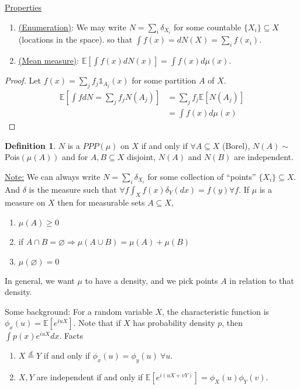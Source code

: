 \documentclass[12pt,letterpaper]{article}
\theoremstyle{definition}
\newtheorem{defn}[thm]{Definition}
\begin{document}
	\noindent\underline{Properties}
	\begin{enumerate}
		\item[]
		\underline{(Enumeration)}: We may write $N = \sum_{i} \delta_{X_i}$ for some countable $\{X_i\} \subseteq X$ (locations in the space). so that $\int f(x) = dN(X) = \sum_{i} f(x_i)$. 
		
		\item[]\underline{(Mean measure)}: $\mathbb{E}[\int f(x) dN(x)] = \int f(x) d\mu(x)$. 
	\end{enumerate}
	
	\begin{proof}
		Let $f(x) = \sum_j f_j \mathds{1}_{A_j}(x)$ for some partition $A$ of $X$. \begin{align*}
		\mathbb{E}\left[\int fdN = \sum_j f_j N(A_j)\right] &= \sum_j f_j \mathbb{E}[N(A_j)] \\
		&= \int f(x) d\mu(x)
		\end{align*}
	\end{proof}

	\begin{defn}
		$N$ is a $PPP(\mu)$ on $X$ if and only if $\forall A \subseteq X$ (Borel), $N(A) \sim$ Pois$(\mu(A))$ and for $A, B \subseteq X$ disjoint, $N(A)$ and $N(B)$ are independent. 
	\end{defn}

	\underline{Note:} We can always write $N = \sum_{i}\delta_{X_i}$ for some collection of ``points'' $\{X_i\} \subseteq X$. And $\delta$ is the measure such that $\forall f \int_X f(x) \delta_Y(dx) = f(y) \forall f$. If $\mu$ is a measure on $X$ then for measurable sets $A \subseteq X$, \begin{enumerate}
		\item $\mu(A) \geq 0$
		\item if $A \cap B = \varnothing \Rightarrow \mu(A \cup B) = \mu(A) + \mu(B)$
		\item $\mu(\varnothing) = 0$
	\end{enumerate}

	In general, we want $\mu$ to have a density, and we pick points $A$ in relation to that density. 
	
	Some background: For a random variable $X$, the characteristic function is $\phi_x(u) = \mathbb{E}[e^{iuX}]$. Note that if $X$ has probability density $p$, then $\int p(x) e^{iuX}dx$. Facts \begin{enumerate}
		\item $X \stackrel{d}{=} Y$ if and only if $\phi_x(u) = \phi_y(u) \ \forall u$. 
		\item $X, Y$ are independent if and only if $\mathbb{E}[e^{i(uX + vY)}] = \phi_X(u) \phi_Y(v)$. 
	\end{enumerate}
	
\end{document}
